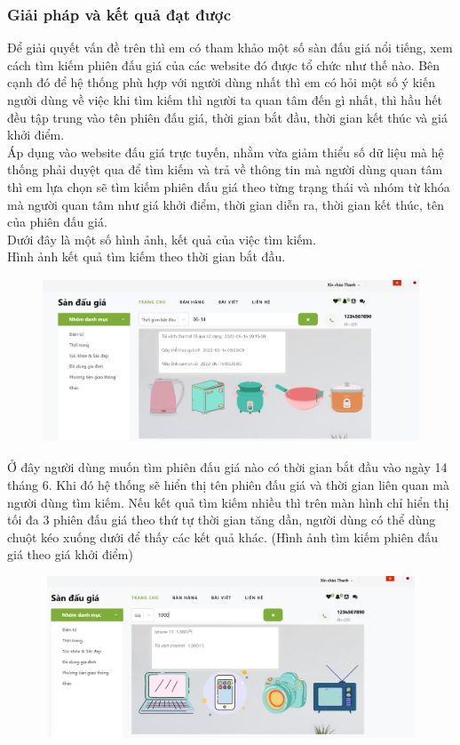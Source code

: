 \documentclass{article}
\begin{document}
\subsubsection{Giải pháp và kết quả đạt được}
Để giải quyết vấn đề trên thì em có tham khảo một số sàn đấu giá nổi tiếng, xem cách tìm kiếm phiên đấu giá của các website đó được tổ chức như thế nào. Bên cạnh đó để hệ thống phù hợp với người dùng nhất thì em có hỏi một số ý kiến người dùng về việc khi tìm kiếm thì người ta quan tâm đến gì nhất, thì hầu hết đều tập trung vào tên phiên đấu giá, thời gian bắt đầu, thời gian kết thúc và giá khởi điểm. \\
Áp dụng vào website đấu giá trực tuyến, nhằm vừa giảm thiểu số dữ liệu mà hệ thống phải duyệt qua để tìm kiếm và trả về thông tin mà người dùng quan tâm thì em lựa chọn sẽ tìm kiếm phiên đấu giá theo từng trạng thái và nhóm từ khóa mà người quan tâm như giá khởi điểm, thời gian diễn ra, thời gian kết thúc, tên của phiên đấu giá. \\
Dưới đây là một số hình ảnh, kết quả của việc tìm kiếm.\\
Hình ảnh kết quả tìm kiếm theo thời gian bắt đầu.
\begin{figure}[H]
    \centering
    \includegraphics[width=11.4cm,height=4.89cm]{images/searchstartime.png}
\end{figure}
Ở đây người dùng muốn tìm phiên đấu giá nào có thời gian bắt đầu vào ngày 14 tháng 6. Khi đó hệ thống sẽ hiển thị tên phiên đấu giá và thời gian liên quan mà người dùng tìm kiếm. Nếu kết quả tìm kiếm nhiều thì trên màn hình chỉ hiển thị tối đa 3 phiên đấu giá theo thứ tự thời gian tăng dần, người dùng có thể dùng chuột kéo xuống dưới để thấy các kết quả khác. 
(Hình ảnh tìm kiếm phiên đấu giá theo giá khởi điểm)
\begin{figure}[H]
    \centering
    \includegraphics[width=11.4cm,height=4.82cm]{images/searchprice.png}
\end{figure}
\end{document}
